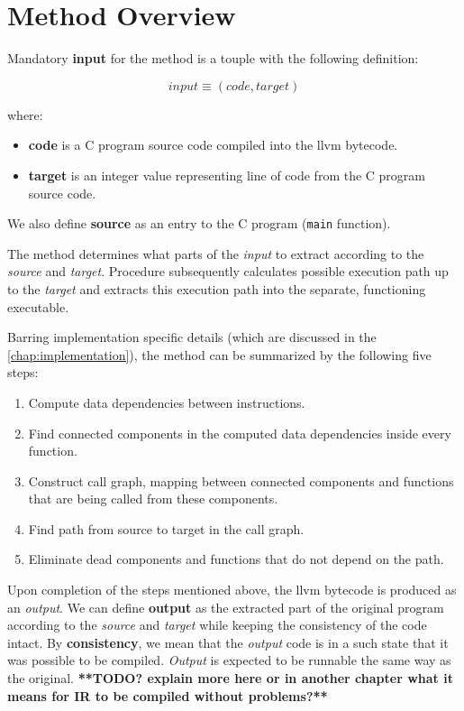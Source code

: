 \documentclass[12pt, twoside]{fithesis2}
\renewcommand{\_}{\leavevmode \kern0.07em\vbox{\hrule width0.4em}}
\newcommand{\squarebullet}{\textcolor{black}{\raisebox{0.15em}{\rule{4pt}{4pt}}}}
\newenvironment{myItemize}{
  \begin{itemize}[
    leftmargin=2em,
    rightmargin=1em,
    itemsep=\parskip,
    parsep=0em,
    topsep=0em,
    partopsep=0em
]
  \renewcommand{\labelitemi}{\squarebullet}
  \renewcommand{\labelitemii}{\textbullet}
}{
  \end{itemize}
}
\newenvironment{myEnumerate}{
  \begin{enumerate}[
    leftmargin=2em,
    rightmargin=1em,
    itemsep=\parskip,
    parsep=0em,
    topsep=0em,
    partopsep=0em
]
}{
  \end{enumerate}
}
\begin{document}
\section{Method Overview}
\label{sec:method_overview}

Mandatory \textbf{input} for the method is a touple with the following
definition:

$$
input \equiv (code, target)
$$

where:
\begin{myItemize}
\item \textbf{code} is a C program source code compiled into the llvm bytecode.
\item \textbf{target} is an integer value representing line of code from the
C program source code.
\end{myItemize}

We also define \textbf{source} as an entry to the C program
(\texttt{main} function).

\bigskip

The method determines what parts of the \emph{input} to extract according to
the \emph{source} and \emph{target}.
Procedure subsequently calculates possible execution path up to the
\emph{target} and extracts this execution path into the separate, functioning
executable.

Barring implementation specific details (which are discussed in the
\autoref{chap:implementation}), the method can be summarized by the following
five steps:

\begin{myEnumerate}
\item Compute data dependencies between instructions.
\item Find connected components in the computed data dependencies inside
every function.
\item Construct call graph, mapping between connected components and functions
that are being called from these components.
\item Find path from source to target in the call graph.
\item Eliminate dead components and functions that do not depend on the path.
\end{myEnumerate}

\bigskip
Upon completion of the steps mentioned above, the llvm bytecode is produced as
an \emph{output}.
We can define \textbf{output} as the extracted part of the original program
according to the \emph{source} and \emph{target} while keeping the consistency
of the code intact.
By \textbf{consistency}, we mean that the \emph{output} code is in a such state
that it was possible to be compiled.
\emph{Output} is expected to be runnable the same way as
the original.
\textbf{**TODO? explain more here or in another chapter what it means for IR to be
compiled without problems?**}
\end{document}
